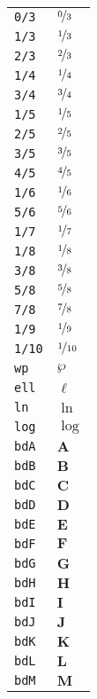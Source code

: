 \begin{longtable}{ll}
\texttt{0/3}&${}\nicefrac{0}{3} {}$\\
\texttt{1/3}&${}\nicefrac{1}{3} {}$\\
\texttt{2/3}&${}\nicefrac{2}{3} {}$\\
\texttt{1/4}&${}\nicefrac{1}{4} {}$\\
\texttt{3/4}&${}\nicefrac{3}{4} {}$\\
\texttt{1/5}&${}\nicefrac{1}{5} {}$\\
\texttt{2/5}&${}\nicefrac{2}{5} {}$\\
\texttt{3/5}&${}\nicefrac{3}{5} {}$\\
\texttt{4/5}&${}\nicefrac{4}{5} {}$\\
\texttt{1/6}&${}\nicefrac{1}{6} {}$\\
\texttt{5/6}&${}\nicefrac{5}{6} {}$\\
\texttt{1/7}&${}\nicefrac{1}{7} {}$\\
\texttt{1/8}&${}\nicefrac{1}{8} {}$\\
\texttt{3/8}&${}\nicefrac{3}{8} {}$\\
\texttt{5/8}&${}\nicefrac{5}{8} {}$\\
\texttt{7/8}&${}\nicefrac{7}{8} {}$\\
\texttt{1/9}&${}\nicefrac{1}{9} {}$\\
\texttt{1/10}&${}\nicefrac{1}{10} {}$\\
\texttt{wp}&${}\wp {}$\\
\texttt{ell}&${}\ell {}$\\
\texttt{ln}&${}\ln {}$\\
\texttt{log}&${}\log {}$\\
\texttt{bdA}&${}\textbf{A}{}$\\
\texttt{bdB}&${}\textbf{B}{}$\\
\texttt{bdC}&${}\textbf{C}{}$\\
\texttt{bdD}&${}\textbf{D}{}$\\
\texttt{bdE}&${}\textbf{E}{}$\\
\texttt{bdF}&${}\textbf{F}{}$\\
\texttt{bdG}&${}\textbf{G}{}$\\
\texttt{bdH}&${}\textbf{H}{}$\\
\texttt{bdI}&${}\textbf{I}{}$\\
\texttt{bdJ}&${}\textbf{J}{}$\\
\texttt{bdK}&${}\textbf{K}{}$\\
\texttt{bdL}&${}\textbf{L}{}$\\
\texttt{bdM}&${}\textbf{M}{}$\\

\end{longtable}
